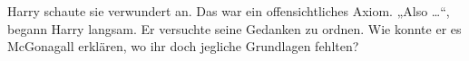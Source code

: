 Harry schaute sie verwundert an. Das war ein offensichtliches Axiom.
„Also …“, begann Harry langsam. Er versuchte seine Gedanken zu ordnen. Wie konnte er es McGonagall erklären, wo ihr doch jegliche Grundlagen fehlten?
